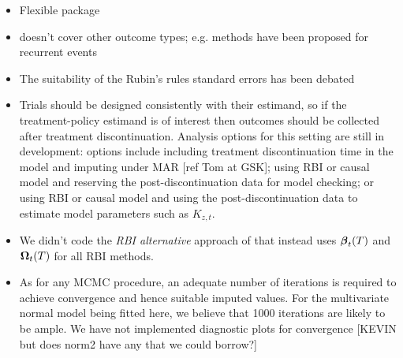 \begin{itemize}
\item Flexible package
\item doesn't cover other outcome types; e.g. methods have been proposed for recurrent events \citep{Keene++14}
\item The suitability of the Rubin's rules standard errors has been debated \citep{ian:Carpenter_letter,Carpenter++14,Cro++19}
\item Trials should be designed consistently with their estimand, so if the treatment-policy estimand is of interest then outcomes should be collected after treatment discontinuation. Analysis options for this setting are still in development: options include including treatment discontinuation time in the model and imputing under MAR [ref Tom at GSK]; using RBI or causal model and reserving the post-discontinuation data for model checking; or using RBI or causal model and using the post-discontinuation data to estimate model parameters such as $K_{z,t}$. 
\item We didn't code the \emph{RBI alternative} approach of \citet{ian:RBIcausal} that instead uses $\boldsymbol{\beta}_t(T)$ and $\boldsymbol{\Omega}_t(T)$ for all RBI methods.
\item As for any MCMC procedure, an adequate number of iterations is required to achieve convergence and hence suitable imputed values. 
For the multivariate normal model being fitted here, we believe that 1000 iterations are likely to be ample. 
We have not implemented diagnostic plots for convergence [KEVIN but does norm2 have any that we could borrow?]

\end{itemize}

%
%


\address{Ian R White\\
MRC Clinical Trials Unit at UCL\\
90 High Holborn, 2nd Floor, London WC1V 6LJ\\
UK\\
ORCiD: 0000-0002-6718-7661\\
  }

\address{Kevin McGrath\\
MRC Clinical Trials Unit at UCL\\
90 High Holborn, 2nd Floor, London WC1V 6LJ\\
UK\\
  (ORCiD if desired)\\
  }

